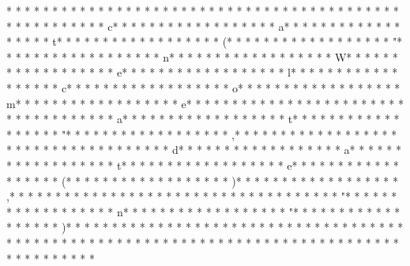 {* * *  * * *  * * *  *  * * *  *  * * *  *  * * *  * * *  * * *  *  * * *  *  * * *  *  * * *  * * *  * * *  *  * * *  *  * * *  * c* * *  * * *  * * *  *  * * *  *  * * *  * a* * *  * * *  * * *  *  * * *  *  * * *  * t* * *  * * *  * * *  *  * * *  *  * * *  * (* * *  * * *  * * *  *  * * *  *  * * *  * "* * *  * * *  * * *  *  * * *  *  * * *  * n* * *  * * *  * * *  *  * * *  *  * * *  * W* * *  * * *  * * *  *  * * *  *  * * *  * e* * *  * * *  * * *  *  * * *  *  * * *  * l* * *  * * *  * * *  *  * * *  *  * * *  * c* * *  * * *  * * *  *  * * *  *  * * *  * o* * *  * * *  * * *  *  * * *  *  * * *  * m* * *  * * *  * * *  *  * * *  *  * * *  * e* * *  * * *  * * *  *  * * *  *  * * *  *  * * *  * * *  * * *  *  * * *  *  * * *  * a* * *  * * *  * * *  *  * * *  *  * * *  * t* * *  * * *  * * *  *  * * *  *  * * *  * "* * *  * * *  * * *  *  * * *  *  * * *  * ,* * *  * * *  * * *  *  * * *  *  * * *  *  * * *  * * *  * * *  *  * * *  *  * * *  * d* * *  * * *  * * *  *  * * *  *  * * *  * a* * *  * * *  * * *  *  * * *  *  * * *  * t* * *  * * *  * * *  *  * * *  *  * * *  * e* * *  * * *  * * *  *  * * *  *  * * *  * (* * *  * * *  * * *  *  * * *  *  * * *  * )* * *  * * *  * * *  *  * * *  *  * * *  * ,* * *  * * *  * * *  *  * * *  *  * * *  *  * * *  * * *  * * *  *  * * *  *  * * *  * "* * *  * * *  * * *  *  * * *  *  * * *  * n* * *  * * *  * * *  *  * * *  *  * * *  * "* * *  * * *  * * *  *  * * *  *  * * *  * )* * *  * * *  * * *  *  * * *  *  * * *  *  * * *  * * *  * * *  *  * * *  *  * * *  * 
* * *  * * *  * * *  *  * * *  *  * * *  * }* * *  * * *  * * *  *  * * *  *  * * *  * 
* * *  * * *  * * *  *  * * *  *  * * *  * 

